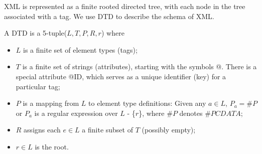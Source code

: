 
XML is represented as a finite rooted directed tree, with each node in the tree associated with a tag. We use DTD to describe the schema of XML.


\begin{definition} A DTD is a 5-tuple($L, T, P, R, r$) where 
 \begin{itemize}[noitemsep,topsep=0pt]
  \item $L$ is a ﬁnite set of element types (tags);
  \item $T$ is a ﬁnite set of strings (attributes), starting with the symbols @. There is a special attribute @ID, which serves as a unique identifier (key) for a particular tag;
  \item $P$ is a mapping from $L$ to element type definitions: Given any $a \in L$, $P_a = \#P$ or  $P_a$ is a regular expression over $L$ - \{$r$\}, where $\#P$ denotes $\#PCDATA$;
  \item $R$ assigns  each $e \in L $ a ﬁnite  subset of $T$ (possibly empty); 
   \item $r \in L$ is the root.
\end{itemize}
\end{definition}





